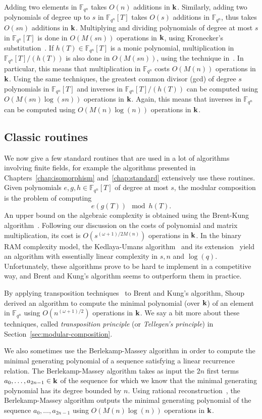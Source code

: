 Adding two elements in $\mathbb{F}_{q^n}$ takes $O(n)$ additions in $\mathbf{k}$.
Similarly, adding two polynomials of degree up to $s$ in $\mathbb{F}_{q^n}\left[
T \right]$ takes $O(s)$ additions in $\mathbb{F}_{q^n}$, thus takes $O(sn)$
additions in $\mathbf{k}$. Multiplying and dividing polynomials of degree at most $s$ in
$\mathbb{F}_{q^n}\left[ T \right]$ is done in $O(M(sn))$
operations in $\mathbf{k}$, using Kronecker's substitution~\cite{Moenck76, Kaltofen87,
GG13, GS92, Harvey09}. If $h(T)\in\mathbb{F}_{q^n}[T]$ is a monic polynomial,
multiplication in $\mathbb{F}_{q^n}[T]/(h(T))$ is also done in $O(M(sn))$, using
the technique in~\cite{PS06}. In particular, this means that multiplication in
$\mathbb{F}_{q^n}$ costs $O(M(n))$ operations in $\mathbf{k}$. Using the same techniques,
the greatest common divisor (gcd) of degree $s$ polynomials in
$\mathbb{F}_{q^n}[T]$ and inverses in $\mathbb{F}_{q^n}[T]/(h(T))$ can be
computed using $O(M(sn)\log(sn))$ operations in $\mathbf{k}$. Again, this means that
inverses in $\mathbb{F}_{q^n}$ can be computed using $O(M(n)\log(n))$
operations in $\mathbf{k}$.

\subsection{Classic routines}

We now give a few standard routines that are used in a lot of algorithms
involving finite fields, for example the algorithms presented in
Chapters~\ref{chap:isomorphism} and~\ref{chap:standard} extensively use these
routines.
Given polynomials $e, g, h\in\mathbb{F}_{q^n}[T]$ of degree at most $s$, the
modular composition is the problem of computing
\[
  e(g(T))\mod h(T).
\]
An upper bound on the algebraic complexity is obtained using the Brent-Kung
algorithm~\cite{BK78}. Following our discussion on the costs of polynomial
and matrix multiplication, its cost is $O(s^{(\omega+1)/2M(n)})$ operations in
$\mathbf{k}$. In the binary RAM complexity model, the Kedlaya-Umans
algorithm~\cite{KU11} and its extension~\cite{PS13} yield an algorithm with
essentially linear complexity in $s, n$ and $\log(q)$. Unfortunately, these
algorithms prove to be hard te implement in a competitive way, and Brent and
Kung's algorithm seems to outperform them in practice.

By applying transposition techniques~\cite{BLS03, DeFeo10, DS10, BCS13} to Brent
and Kung's algorithm, Shoup~\cite{Shoup94, Shoup99} derived an algorithm to
compute the minimal polynomial (over $\mathbf{k}$) of an element in $\mathbb{F}_{q^n}$
using $O(n^{(\omega+1)/2})$ operations in $\mathbf{k}$. We say a bit more about these
techniques, called \emph{transposition principle} (or \emph{Tellegen's
principle}) in Section~\ref{sec:modular-composition}.

We also sometimes use the Berlekamp-Massey algorithm in order to compute the
minimal generating polynomial of a sequence satisfying a linear recurrence
relation. The Berlekamp-Massey algorithm takes
as input the $2n$ first terms $a_0, \dots, a_{2n-1}\in\mathbf{k}$ of the
sequence for which we know that the minimal generating polynomial has its degree
bounded by $n$. Using rational reconstruction~\cite[Chapter 7]{BCGLLSS17},
the Berlekamp-Massey algorithm outputs the minimal generating polynomial of the
sequence $a_0, \dots, a_{2n-1}$ using $O(M(n)\log(n))$ operations in $\mathbf{k}$.
